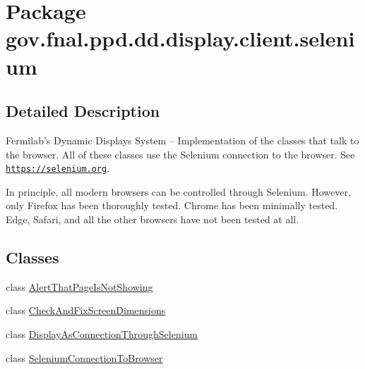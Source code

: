 \hypertarget{namespacegov_1_1fnal_1_1ppd_1_1dd_1_1display_1_1client_1_1selenium}{\section{Package gov.\-fnal.\-ppd.\-dd.\-display.\-client.\-selenium}
\label{namespacegov_1_1fnal_1_1ppd_1_1dd_1_1display_1_1client_1_1selenium}
}


\subsection{Detailed Description}
Fermilab's Dynamic Displays System -- Implementation of the classes that talk to the browser. All of these classes use the Selenium connection to the browser. See \href{https://selenium.org}{\tt https\-://selenium.\-org}. 

In principle, all modern browsers can be controlled through Selenium. However, only Firefox has been thoroughly tested. Chrome has been minimally tested. Edge, Safari, and all the other browsers have not been tested at all. \subsection*{Classes}
\begin{DoxyCompactItemize}
\item 
class \hyperlink{classgov_1_1fnal_1_1ppd_1_1dd_1_1display_1_1client_1_1selenium_1_1AlertThatPageIsNotShowing}{Alert\-That\-Page\-Is\-Not\-Showing}
\item 
class \hyperlink{classgov_1_1fnal_1_1ppd_1_1dd_1_1display_1_1client_1_1selenium_1_1CheckAndFixScreenDimensions}{Check\-And\-Fix\-Screen\-Dimensions}
\item 
class \hyperlink{classgov_1_1fnal_1_1ppd_1_1dd_1_1display_1_1client_1_1selenium_1_1DisplayAsConnectionThroughSelenium}{Display\-As\-Connection\-Through\-Selenium}
\item 
class \hyperlink{classgov_1_1fnal_1_1ppd_1_1dd_1_1display_1_1client_1_1selenium_1_1SeleniumConnectionToBrowser}{Selenium\-Connection\-To\-Browser}
\end{DoxyCompactItemize}
